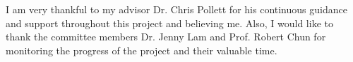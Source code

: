 I am very thankful to my advisor Dr. Chris Pollett for his continuous guidance and support throughout this project and believing me. Also, I would like to thank the committee members Dr. Jenny Lam and Prof. Robert Chun for monitoring the progress of the project and their valuable time.
